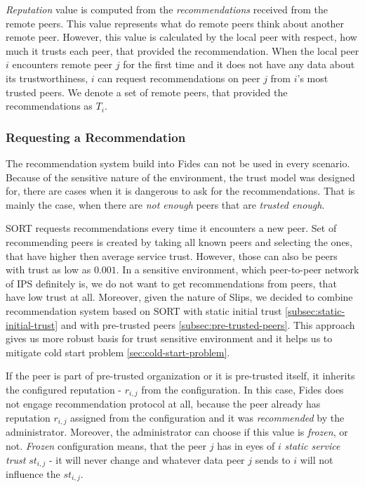\textit{Reputation} value is computed from the \textit{recommendations} received from the remote peers. This value represents what do remote peers think about another remote peer. However, this value is calculated by the local peer with respect, how much it trusts each peer, that provided the recommendation.
When the local peer $i$ encounters remote peer $j$ for the first time and it does not have any data about its trustworthiness, $i$ can request recommendations on peer $j$ from $i$'s most trusted peers.
We denote a set of remote peers, that provided the recommendations as $T_{i}$.

\subsubsection{Requesting a Recommendation}
The recommendation system build into Fides can not be used in every scenario.
Because of the sensitive nature of the environment, the trust model was designed for, there are cases when it is dangerous to ask for the recommendations.
That is mainly the case, when there are \textit{not enough} peers that are \textit{trusted enough}.

SORT \cite{sort} requests recommendations every time it encounters a new peer. Set of recommending peers is created by taking all known peers and selecting the ones, that have higher then average service trust.
However, those can also be peers with trust as low as $0.001$. In a sensitive environment, which peer-to-peer network of IPS definitely is, we do not want to get recommendations from peers, that have low trust at all.
Moreover, given the nature of Slips, we decided to combine recommendation system based on SORT with static initial trust \ref{subsec:static-initial-trust} and with pre-trusted peers \ref{subsec:pre-trusted-peers}. 
This approach gives us more robust basis for trust sensitive environment and it helps us to mitigate cold start problem \ref{sec:cold-start-problem}.

If the peer is part of pre-trusted organization or it is pre-trusted itself, it inherits the configured reputation - $r_{i, j}$ from the configuration.
In this case, Fides does not engage recommendation protocol at all, because the peer already has reputation $r_{i,j}$ assigned from the configuration and it was \textit{recommended} by the administrator.
Moreover, the administrator can choose if this value is \textit{frozen}, or not. \textit{Frozen} configuration means, that the peer $j$ has in eyes of $i$ \textit{static service trust} $st_{i, j}$ - it will never change and whatever data peer $j$ sends to $i$ will not influence the $st_{i,j}$.

